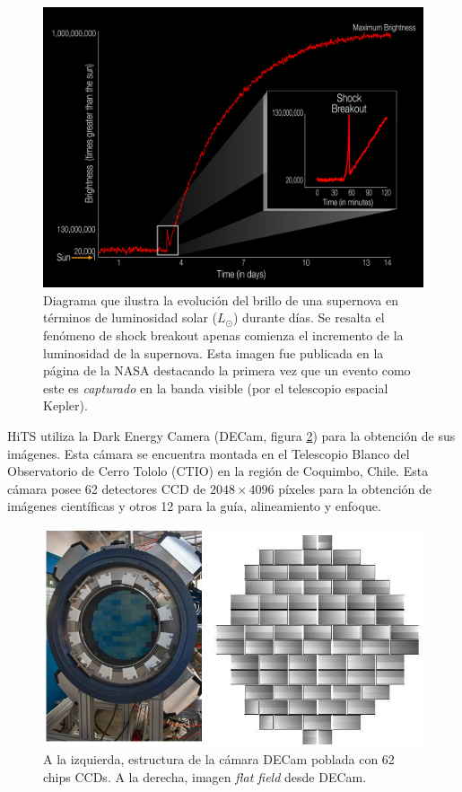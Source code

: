 

\begin{figure}
\centering
\includegraphics[scale=.25]{images/breakout}
\caption{Diagrama que ilustra la evoluci\'on del brillo de una supernova en t\'erminos de luminosidad solar ($L_{\odot}$) durante d\'ias. Se resalta el fen\'omeno de shock breakout apenas comienza el incremento de la luminosidad de la supernova. Esta imagen fue publicada en la p\'agina de la NASA destacando la primera vez que un evento como este es \textit{capturado} en la banda visible (por el telescopio espacial Kepler).}
\label{fig:f2}
\end{figure}

HiTS utiliza la Dark Energy Camera (DECam, figura \ref{fig:f3}) para la obtenci\'on de sus im\'agenes. Esta c\'amara se encuentra montada en el Telescopio Blanco del Observatorio de Cerro Tololo (CTIO) en la regi\'on de Coquimbo, Chile. Esta c\'amara posee 62 detectores CCD de $2048 \times 4096$ p\'ixeles para la obtenci\'on de im\'agenes cient\'ificas y otros 12 para la gu\'ia, alineamiento y enfoque. 
\bigskip

\begin{figure}[h!]
\centering
\includegraphics[scale=.5]{images/CCDs.jpg}
\caption{A la izquierda, estructura de la c\'amara DECam poblada con 62 chips CCDs. A la derecha, imagen \textit{flat field} desde DECam.}
\label{fig:f3}
\end{figure}

